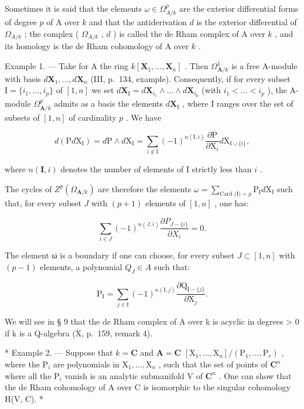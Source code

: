 Sometimes it is said that the elements \(\omega\in\Omega_{A/k}^{p}\) are the exterior differential forms of degree \(p\) of A over \(k\) and that the antiderivation \(d\) is the exterior differential of \(\Omega_{A/k}\) ; the complex ( \(\Omega_{A/k}\) , \(d\) ) is called the de Rham complex of A over \(k\) , and its homology is the de Rham cohomology of A over \(k\) .

Example 1. --- Take for A the ring \(k[\mathbf{X}_{1},\ldots,\mathbf{X}_{n}]\) . Then \(\Omega_{\mathbf{A}/k}^{1}\) is a free A-module with basis \(d\mathbf{X}_{1},\ldots,d\mathbf{X}_{n}\) (III, p.~134, example). Consequently, if for every subset \(\mathrm{I}=\{i_{1},\ldots,i_{p}\}\) of \([1,n]\) we set \(d\mathbf{X}_{\mathrm{I}}=d\mathbf{X}_{i_{1}}\wedge\ldots\wedge d\mathbf{X}_{i_{p}}\) (with \(i_{1}<\ldots<i_{p}\) ), the A-module \(\Omega_{\mathbf{A}/k}^{p}\) admits as a basis the elements \(d\mathbf{X}_{\mathrm{I}}\) , where I ranges over the set of subsets of \([1,n]\) of cardinality \(p\) . We have

\[
d (\mathrm{P} d \mathrm{X} _ {\mathrm{I}}) = d \mathrm{P} \wedge d \mathrm{X} _ {\mathrm{I}} = \sum_ {i \notin \mathrm{I}} (- 1) ^ {n (\mathrm{I}, i)} \frac {\partial \mathrm{P}}{\partial \mathrm{X} _ {i}} d \mathrm{X} _ {\mathrm{I} \cup \{i \}},
\]

where \(n(\mathbf{I}, i)\) denotes the number of elements of I strictly less than \(i\) .

The cycles of \(Z^{p}(\Omega_{\mathbf{A}/k})\) are therefore the elements \(\omega = \sum_{\text{Card (I)} = p} \mathrm{P}_{\mathrm{I}} d\mathrm{X}_{\mathrm{I}}\) such that, for every subset \(J\) with \((p + 1)\) elements of \([1, n]\) , one has:

\[
\sum_ {i \in J} (- 1) ^ {n (J, i)} \frac {\partial P _ {J - \{i \}}}{\partial X _ {i}} = 0.
\]

The element ω is a boundary if one can choose, for every subset \(J \subset [1, n]\) with \((p - 1)\) elements, a polynomial \(Q_{J} \in A\) such that:

\[
\mathrm{P} _ {\mathrm{I}} = \sum_ {j \in \mathrm{I}} (- 1) ^ {n (\mathrm{I}, j)} \frac {\partial \mathrm{Q} _ {\mathrm{I} - \{j \}}}{\partial \mathrm{X} _ {j}}.
\]

We will see in § 9 that the de Rham complex of A over k is acyclic in degrees \textgreater{} 0 if k is a Q-algebra (X, p.~159, remark 4).

* Example 2. --- Suppose that \(k = \mathbf{C}\) and \(\mathbf{A} = \mathbf{C}\) \([\mathrm{X}_1, \ldots, \mathrm{X}_n] / (\mathrm{P}_1, \ldots, \mathrm{P}_r)\) , where the \(\mathrm{P}_i\) are polynomials in \(\mathrm{X}_1, \ldots, \mathrm{X}_n\) , such that the set of points of \(\mathbf{C}^n\) where all the \(\mathrm{P}_i\) vanish is an analytic submanifold V of \(\mathbf{C}^n\) . One can show that the de Rham cohomology of A over C is isomorphic to the singular cohomology H(V, C). *

